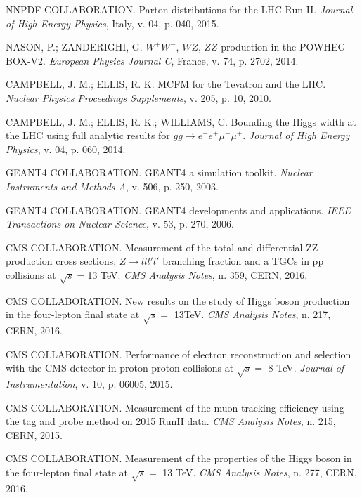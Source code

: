 \begin{thebibliography}{}
NNPDF COLLABORATION. Parton distributions for the LHC Run II. \textit{Journal of High Energy Physics}, Italy, v. 04, p. 040, 2015.

NASON, P.; ZANDERIGHI, G. $W^{+}W^{-}$, $WZ$, $ZZ$ production in the POWHEG-BOX-V2. \textit{European Physics Journal C}, France, v. 74, p. 2702, 2014.

CAMPBELL, J. M.; ELLIS, R. K. MCFM for the Tevatron and the LHC. \textit{Nuclear Physics Proceedings Supplements}, v. 205, p. 10, 2010.

CAMPBELL, J. M.; ELLIS, R. K.; WILLIAMS, C. Bounding the Higgs width at the LHC using full analytic results for $gg \rightarrow e^{-}e^{+}\mu^{-}\mu^{+}$. \textit{Journal of High Energy Physics}, v. 04, p. 060, 2014.

GEANT4 COLLABORATION. GEANT4 a simulation toolkit. \textit{Nuclear Instruments and Methods A}, v. 506, p. 250, 2003.

GEANT4 COLLABORATION. GEANT4 developments and applications. \textit{IEEE Transactions on Nuclear Science}, v. 53, p. 270, 2006.

CMS COLLABORATION. Measurement of the total and differential ZZ production cross sections, $Z \rightarrow ll l'l'$ branching fraction and a TGCs in pp collisions at $\sqrt{s} = $13 TeV. \textit{CMS Analysis Notes}, n. 359, CERN, 2016.

CMS COLLABORATION. New results on the study of Higgs boson production in the four-lepton final state at $\sqrt{s}=$ 13TeV. \textit{CMS Analysis Notes}, n. 217, CERN, 2016.

CMS COLLABORATION. Performance of electron reconstruction and selection with the CMS detector in proton-proton collisions at $\sqrt{s}=$ 8 TeV. \textit{Journal of Instrumentation}, v. 10, p. 06005, 2015.

CMS COLLABORATION. Measurement of the muon-tracking efficiency using the tag and probe method on 2015 RunII data. \textit{CMS Analysis Notes}, n. 215, CERN, 2015.

CMS COLLABORATION. Measurement of the properties of the Higgs boson in the four-lepton final state at $\sqrt{s}=$ 13 TeV. \textit{CMS Analysis Notes}, n. 277, CERN, 2016.


\end{thebibliography}
